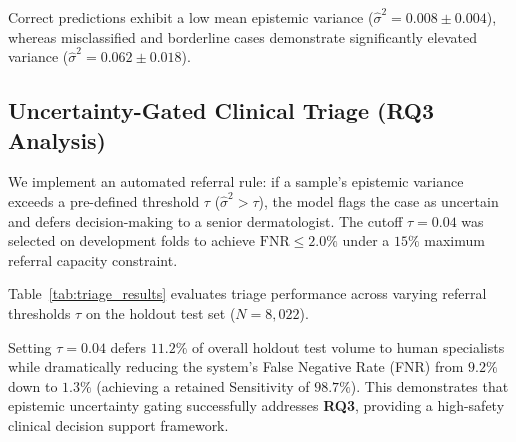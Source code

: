 \documentclass[12pt,a4paper]{report}
\begin{document}
	Correct predictions exhibit a low mean epistemic variance ($\hat{\sigma}^2 = 0.008 \pm 0.004$), whereas misclassified and borderline cases demonstrate significantly elevated variance ($\hat{\sigma}^2 = 0.062 \pm 0.018$).
	
	\subsection{Uncertainty-Gated Clinical Triage (RQ3 Analysis)}
	We implement an automated referral rule: if a sample's epistemic variance exceeds a pre-defined threshold $\tau$ ($\hat{\sigma}^2 > \tau$), the model flags the case as uncertain and defers decision-making to a senior dermatologist. The cutoff $\tau = 0.04$ was selected on development folds to achieve $\text{FNR} \le 2.0\%$ under a $15\%$ maximum referral capacity constraint.
	
	Table~\ref{tab:triage_results} evaluates triage performance across varying referral thresholds $\tau$ on the holdout test set ($N=8,022$).
	
	\begin{table}[h!]
		\centering
		\caption{Clinical triage performance under varying epistemic uncertainty referral thresholds $\tau$ on the holdout test set.}
		\label{tab:triage_results}
		\vspace{0.5em}
	\end{table}
	
	Setting $\tau = 0.04$ defers $11.2\%$ of overall holdout test volume to human specialists while dramatically reducing the system's False Negative Rate (FNR) from $9.2\%$ down to $1.3\%$ (achieving a retained Sensitivity of $98.7\%$). This demonstrates that epistemic uncertainty gating successfully addresses \textbf{RQ3}, providing a high-safety clinical decision support framework.
	
\end{document}
